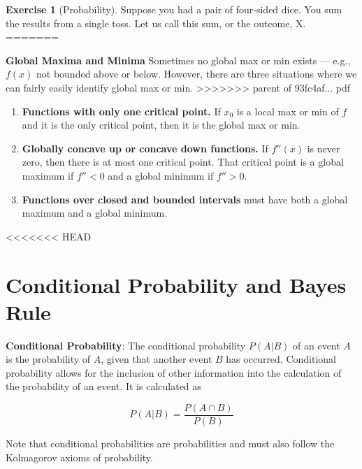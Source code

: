 \documentclass[]{book}
\providecommand{\tightlist}{%
  \setlength{\itemsep}{0pt}\setlength{\parskip}{0pt}}
\theoremstyle{definition}
\theoremstyle{definition}
\theoremstyle{definition}
\newtheorem{exercise}{Exercise}[chapter]
\theoremstyle{remark}
\begin{document}
\begin{exercise}[Probability]
\protect\hypertarget{exr:prob1}{}{\label{exr:prob1} {} }
Suppose you had a pair of four-sided dice. You sum the results from a single toss. Let us call this sum, or the outcome, X.
=======

\textbf{Global Maxima and Minima} Sometimes no global max or min exists --- e.g., \(f(x)\) not bounded above or below. However, there are three situations where we can fairly easily identify global max or min.
>>>>>>> parent of 93fc4af... pdf

\begin{enumerate}
\def\labelenumi{\arabic{enumi}.}
\tightlist
\item
  \textbf{Functions with only one critical point.} If \(x_0\) is a local max or min of \(f\) and it is the only critical point, then it is the global max or min.
\item
  \textbf{Globally concave up or concave down functions.} If \(f''(x)\) is never zero, then there is at most one critical point. That critical point is a global maximum if \(f''<0\) and a global minimum if \(f''>0\).
\item
  \textbf{Functions over closed and bounded intervals} must have both a global maximum and a global minimum.
\end{enumerate}
<<<<<<< HEAD
\end{exercise}

\hypertarget{conditional-probability-and-bayes-rule}{%
\section{Conditional Probability and Bayes Rule}\label{conditional-probability-and-bayes-rule}}

\textbf{Conditional Probability}: The conditional probability \(P(A|B)\) of an event \(A\) is the probability of \(A\), given that another event \(B\) has occurred. Conditional probability allows for the inclusion of other information into the calculation of the probability of an event. It is calculated as

\[P(A|B)=\frac{P(A\cap B)}{P(B)}\]

Note that conditional probabilities are probabilities and must also follow the Kolmagorov axioms of probability.
\end{document}
